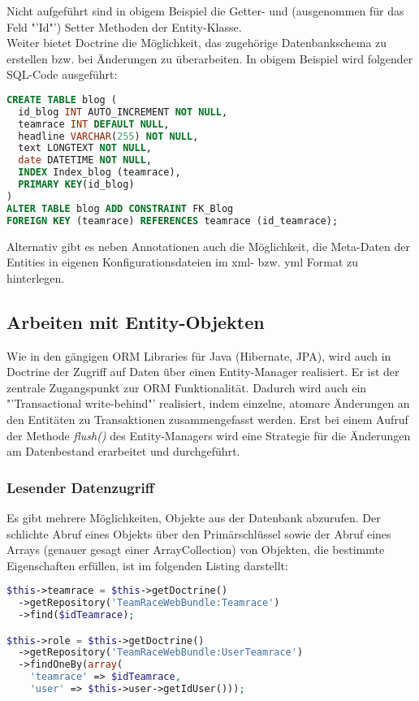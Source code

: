 \documentclass[12pt]{report}
\begin{document}
Nicht aufgeführt sind in obigem Beispiel die Getter- und (ausgenommen für das Feld "'Id"') Setter Methoden der Entity-Klasse.\\

Weiter bietet Doctrine die Möglichkeit, das zugehörige Datenbankschema zu erstellen bzw. bei Änderungen zu überarbeiten. In obigem Beispiel wird folgender SQL-Code ausgeführt:

\begin{lstlisting}[language=sql, caption=Erzeugter SQL-Code zu obigem Beispiel]
CREATE TABLE blog (
  id_blog INT AUTO_INCREMENT NOT NULL, 
  teamrace INT DEFAULT NULL, 
  headline VARCHAR(255) NOT NULL, 
  text LONGTEXT NOT NULL, 
  date DATETIME NOT NULL, 
  INDEX Index_blog (teamrace), 
  PRIMARY KEY(id_blog)
)
ALTER TABLE blog ADD CONSTRAINT FK_Blog 
FOREIGN KEY (teamrace) REFERENCES teamrace (id_teamrace);
\end{lstlisting}

Alternativ gibt es neben Annotationen auch die Möglichkeit, die Meta-Daten der Entities in eigenen Konfigurationsdateien im xml- bzw. yml Format zu hinterlegen.


\subsection{Arbeiten mit Entity-Objekten}
\label{Transaktionen}
Wie in den gängigen ORM Libraries für Java (Hibernate, JPA), wird auch in Doctrine der Zugriff auf Daten über einen Entity-Manager realisiert. Er ist der zentrale Zugangspunkt zur ORM Funktionalität. Dadurch wird auch ein "'Transactional write-behind"' realisiert, indem einzelne, atomare Änderungen an den Entitäten zu Transaktionen zusammengefasst werden. Erst bei einem Aufruf der Methode \emph{flush()} des Entity-Managers wird eine Strategie für die Änderungen am Datenbestand erarbeitet und durchgeführt. \cite{Doctrine:Architecture}

\subsubsection{Lesender Datenzugriff}

Es gibt mehrere Möglichkeiten, Objekte aus der Datenbank abzurufen. Der schlichte Abruf eines Objekts über den Primärschlüssel sowie der Abruf eines Arrays (genauer gesagt einer ArrayCollection) von Objekten, die bestimmte Eigenschaften erfüllen, ist im folgenden Listing darstellt:

\begin{lstlisting}[language=php, caption=Auszug aus \\src/TeamRace/WebBundle/Controller/TeamraceController.php]
$this->teamrace = $this->getDoctrine()
  ->getRepository('TeamRaceWebBundle:Teamrace')
  ->find($idTeamrace);

$this->role = $this->getDoctrine()
  ->getRepository('TeamRaceWebBundle:UserTeamrace')
  ->findOneBy(array(
    'teamrace' => $idTeamrace, 
    'user' => $this->user->getIdUser()));
\end{lstlisting}
\end{document}
